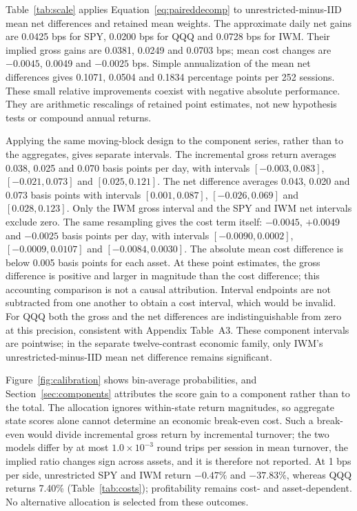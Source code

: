 Table~\ref{tab:scale} applies Equation~\eqref{eq:paireddecomp} to unrestricted-minus-IID mean net differences and retained mean weights. The approximate daily net gains are 0.0425 bps for SPY, 0.0200 bps for QQQ and 0.0728 bps for IWM. Their implied gross gains are 0.0381, 0.0249 and 0.0703 bps; mean cost changes are $-0.0045$, 0.0049 and $-0.0025$ bps. Simple annualization of the mean net differences gives 0.1071, 0.0504 and 0.1834 percentage points per 252 sessions. These small relative improvements coexist with negative absolute performance. They are arithmetic rescalings of retained point estimates, not new hypothesis tests or compound annual returns.

Applying the same moving-block design to the component series, rather than to the aggregates, gives separate intervals. The incremental gross return averages 0.038, 0.025 and 0.070 basis points per day, with intervals $[-0.003,0.083]$, $[-0.021,0.073]$ and $[0.025,0.121]$. The net difference averages 0.043, 0.020 and 0.073 basis points with intervals $[0.001,0.087]$, $[-0.026,0.069]$ and $[0.028,0.123]$. Only the IWM gross interval and the SPY and IWM net intervals exclude zero. The same resampling gives the cost term itself: $-0.0045$, $+0.0049$ and $-0.0025$ basis points per day, with intervals $[-0.0090,0.0002]$, $[-0.0009,0.0107]$ and $[-0.0084,0.0030]$. The absolute mean cost difference is below 0.005 basis points for each asset. At these point estimates, the gross difference is positive and larger in magnitude than the cost difference; this accounting comparison is not a causal attribution. Interval endpoints are not subtracted from one another to obtain a cost interval, which would be invalid. For QQQ both the gross and the net differences are indistinguishable from zero at this precision, consistent with Appendix Table~A3. These component intervals are pointwise; in the separate twelve-contrast economic family, only IWM's unrestricted-minus-IID mean net difference remains significant.

Figure~\ref{fig:calibration} shows bin-average probabilities, and Section~\ref{sec:components} attributes the score gain to a component rather than to the total. The allocation ignores within-state return magnitudes, so aggregate state scores alone cannot determine an economic break-even cost. Such a break-even would divide incremental gross return by incremental turnover; the two models differ by at most $1.0\times10^{-3}$ round trips per session in mean turnover, the implied ratio changes sign across assets, and it is therefore not reported. At 1 bps per side, unrestricted SPY and IWM return $-0.47\%$ and $-37.83\%$, whereas QQQ returns 7.40\% (Table~\ref{tab:costs}); profitability remains cost- and asset-dependent. No alternative allocation is selected from these outcomes.

